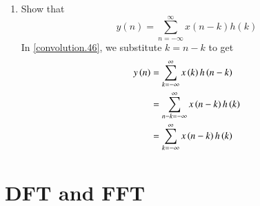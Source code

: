 \documentclass[journal,12pt,twocolumn]{IEEEtran}
\theoremstyle{remark}
\begin{document}
\begin{enumerate}
\item Show that
\begin{equation}
y(n) =  \sum_{n=-\infty}^{\infty}x(n-k)h(k)
\end{equation}
\solution
In \eqref{convolution.46}, we substitute $k = n - k$ to get
\begin{align}
y\left(n\right) &= \sum_{k=-\infty}^{\infty}x\left(k\right)h\left(n - k\right) \\
		  &= \sum_{n - k=-\infty}^{\infty}x\left(n - k\right)h\left(k\right) \\
		  &= \sum_{k=-\infty}^{\infty}x\left(n - k\right)h\left(k\right)
\end{align}
\end{enumerate}


\newpage
\section{DFT and FFT}
\end{document}
